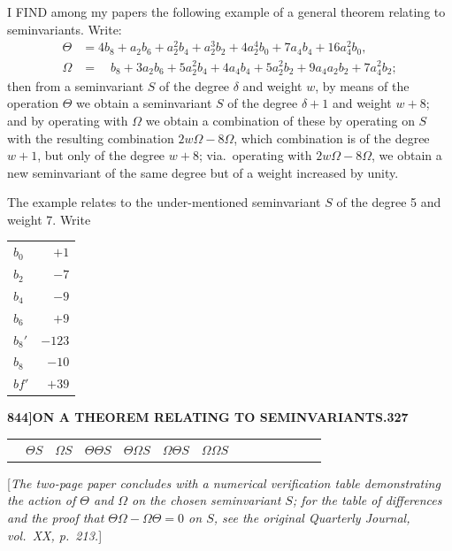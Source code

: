 \documentclass[11pt,a4paper]{book}
\begin{document}
\bigskip

\noindent I FIND among my papers the following example of a general theorem relating to seminvariants. Write:
\begin{align*}
\Theta &= 4b_8 + a_2b_6 + a_2^2b_4 + a_2^3b_2 + 4a_2^4b_0 + 7a_4b_4 + 16a_4^2b_0, \\
\Omega &= \quad b_8 + 3a_2b_6 + 5a_2^2b_4 + 4a_4b_4 + 5a_2^2b_2 + 9a_4a_2b_2 + 7a_4^2b_2;
\end{align*}
then from a seminvariant $S$ of the degree $\delta$ and weight $w$, by means of the operation $\Theta$ we obtain a seminvariant $S$ of the degree $\delta + 1$ and weight $w + 8$; and by operating with $\Omega$ we obtain a combination of these by operating on $S$ with the resulting combination $2w\Omega - 8\Omega$, which combination is of the degree $w + 1$, but only of the degree $w + 8$; via.\ operating with $2w\Omega - 8\Omega$, we obtain a new seminvariant of the same degree but of a weight increased by unity.

The example relates to the under-mentioned seminvariant $S$ of the degree 5 and weight 7. Write
\medskip
\begin{center}
\begin{tabular}{l|r}
$b_0$ & $+1$ \\
$b_2$ & $-7$ \\
$b_4$ & $-9$ \\
$b_6$ & $+9$ \\
$b_8'$ & $-123$ \\
$b_8$ & $-10$ \\
$bf'$ & $+39$
\end{tabular}
\end{center}

\newpage
\setcounter{page}{327}

\noindent\textbf{844]}\hfill\textbf{ON A THEOREM RELATING TO SEMINVARIANTS.}\hfill\textbf{327}

\bigskip

\begin{center}
\begin{tabular}{l|r|r|r|r|r|r|r|r|r|r|r|r|r}
& $\Theta S$ & $\Omega S$ & $\Theta\Theta S$ & $\Theta\Omega S$ & $\Omega\Theta S$ & $\Omega\Omega S$ & & & & & & & \\
\end{tabular}
\end{center}

\medskip

[\textit{The two-page paper concludes with a numerical verification table demonstrating the action of $\Theta$ and $\Omega$ on the chosen seminvariant $S$; for the table of differences and the proof that $\Theta\Omega - \Omega\Theta = 0$ on $S$, see the original \textit{Quarterly Journal}, vol.\ XX, p.\ 213.}]
\end{document}
